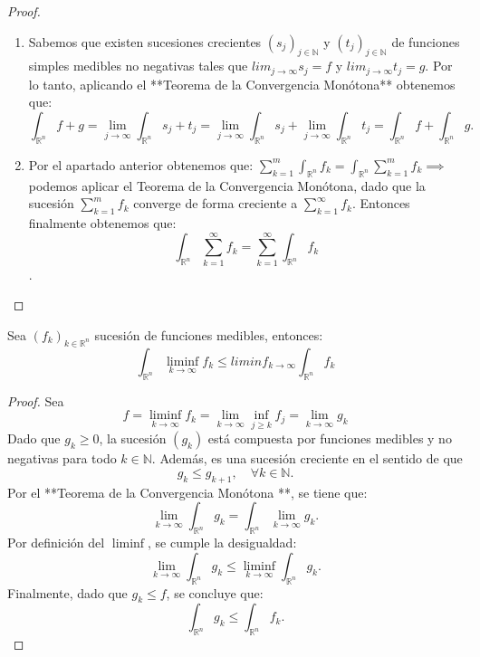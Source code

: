 \begin{proof}
    \begin{enumerate}
        \item Sabemos que existen sucesiones crecientes \( (s_j)_{j \in \mathbb{N}} \) y \(
              (t_j)_{j \in \mathbb{N}} \) de funciones simples medibles no negativas tales
              que $lim_{j \to \infty} s_j = f$ y $lim_{j \to \infty} t_j = g$. Por lo tanto,
              aplicando el **Teorema de la Convergencia Monótona** obtenemos que: $$
                  \int_{\mathbb{R}^n}f+g = \lim_{j\to \infty}\int_{\mathbb{R}^n}s_j + t_j =
                  \lim_{j\to \infty}\int_{\mathbb{R}^n}s_j + \lim_{j\to
                      \infty}\int_{\mathbb{R}^n}t_j = \int_{\mathbb{R}^n}f + \int_{\mathbb{R}^n}g. $$
        \item  Por el apartado anterior obtenemos que: $\sum_{k = 1}^{m}\int_{\mathbb{R}^n}f_k
                  = \int_{\mathbb{R}^n}\sum_{k = 1}^{m}f_k \implies$ podemos aplicar el Teorema
              de la Convergencia Monótona, dado que la sucesión $\sum_{k = 1}^{m}f_k $
              converge de forma creciente a $\sum_{k = 1}^{\infty}f_k$. Entonces finalmente
              obtenemos que: $$\int_{\mathbb{R}^n}\sum_{k = 1}^{\infty}f_k = \sum_{k =
                      1}^{\infty}\int_{\mathbb{R}^n}f_k$$.
    \end{enumerate}
\end{proof}
\begin{lema}
    Sea $(f_k)_{k\in\mathbb{R}^n}$ sucesión de funciones medibles, entonces: $$\int_{\mathbb{R}^n}\liminf_{k\to\infty}f_k \leq liminf_{k\to\infty}\int_{\mathbb{R}^n}f_k$$
\end{lema}
\begin{proof}
    Sea $$ f = \liminf_{k \to \infty} f_k = \lim_{k \to \infty} \inf_{j \geq k} f_j = \lim_{k \to \infty} g_k $$
    Dado que $ g_k \geq 0 $, la sucesión $ (g_k) $ está compuesta por funciones medibles y no negativas para todo $ k \in \mathbb{N} $. Además, es una sucesión creciente en el sentido de que
    $$ g_k \leq g_{k+1}, \quad \forall k \in \mathbb{N}. $$ Por el **Teorema de la Convergencia Monótona **, se tiene que:
    $$ \lim_{k \to \infty} \int_{\mathbb{R}^n} g_k = \int_{\mathbb{R}^n} \lim_{k \to \infty} g_k.$$ Por definición del $ \liminf $, se cumple la desigualdad:
    $$\lim_{k \to \infty} \int_{\mathbb{R}^n} g_k \leq \liminf_{k \to \infty} \int_{\mathbb{R}^n} g_k.$$
    Finalmente, dado que $ g_k \leq f $, se concluye que:
    $$\int_{\mathbb{R}^n} g_k \leq \int_{\mathbb{R}^n} f_k.$$
\end{proof}
